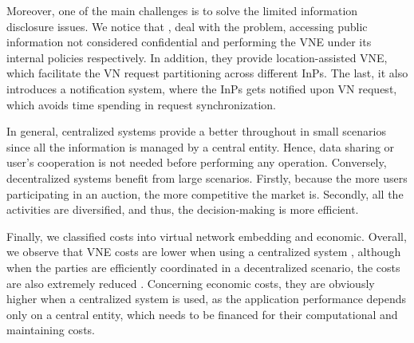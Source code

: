 Moreover, one of the main challenges is to solve the limited information disclosure issues. We notice that \citep{dietrich2015multi}, \citep{chowdhury2010polyvine} deal with the problem, accessing public information not considered confidential and performing the VNE under its internal policies respectively. In addition, they provide location-assisted VNE, which facilitate the VN request partitioning across different InPs. The last, it also introduces a notification system, where the InPs gets notified upon VN request, which avoids time spending in request synchronization. 

In general, centralized systems provide a better throughout in small scenarios since all the information is managed by a central entity. Hence, data sharing or user's cooperation is not needed before performing any operation. Conversely, decentralized systems benefit from large scenarios. Firstly, because the more users participating in an auction, the more competitive the market is. Secondly, all the activities are diversified, and thus, the decision-making is more efficient. 

Finally, we classified costs into virtual network embedding and economic. Overall, we observe that VNE costs are lower when using a centralized system \citep{dietrich2015multi}, although when the parties are efficiently coordinated in a decentralized scenario, the costs are also extremely reduced \citep{chowdhury2010polyvine}. Concerning economic costs, they are obviously higher when a centralized system is used, as the application performance depends only on a central entity, which needs to be financed for their computational and maintaining costs.

